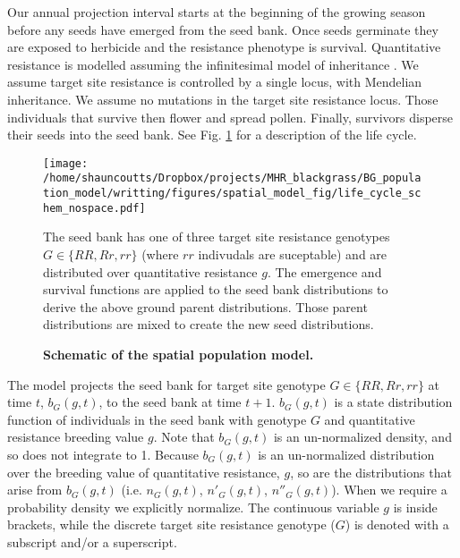 \documentclass[10pt,letterpaper]{article}
\begin{document}
Our annual projection interval starts at the beginning of the growing season before any seeds have emerged from the seed bank. Once seeds germinate they are exposed to herbicide and the resistance phenotype is survival.  Quantitative resistance is modelled assuming the infinitesimal model of inheritance \cite{Fish1918}. We assume target site resistance is controlled by a single locus, with Mendelian inheritance. We assume no mutations in the target site resistance locus. Those individuals that survive then flower and spread pollen. Finally, survivors disperse their seeds into the seed bank. See Fig. \ref{fig:schematic} for a description of the life cycle.  

\begin{figure}[!h]
	\centering
	\texttt{[image: /home/shauncoutts/Dropbox/projects/MHR\_blackgrass/BG\_population\_model/writting/figures/spatial\_model\_fig/life\_cycle\_schem\_nospace.pdf]}
\caption{\bf Schematic of the spatial population model.} The seed bank has one of three target site resistance genotypes $G \in \{RR, Rr, rr\}$ (where $rr$ indivudals are suceptable) and are distributed over quantitative resistance $g$. The emergence and survival functions are applied to the seed bank distributions to derive the above ground parent distributions. Those parent distributions are mixed to create the new seed distributions. \label{fig:schematic}
\end{figure}

The model projects the seed bank for target site genotype $G \in \{RR, Rr, rr\}$ at time $t$, $b_G(g, t)$, to the seed bank at time $t+1$. $b_G(g, t)$ is a state distribution function of individuals in the seed bank with genotype $G$ and quantitative resistance breeding value $g$. Note that $b_G(g, t)$ is an un-normalized density, and so does not integrate to 1. Because $b_G(g, t)$ is an un-normalized distribution over the breeding value of quantitative resistance, $g$, so are the distributions that arise from $b_G(g, t)$ (i.e. $n_G(g, t)$, $n'_G(g, t)$, $n''_G(g, t)$). When we require a probability density we explicitly normalize. The continuous variable $g$ is inside brackets, while the discrete target site resistance genotype ($G$) is denoted with a subscript and/or a superscript.    
\end{document}
